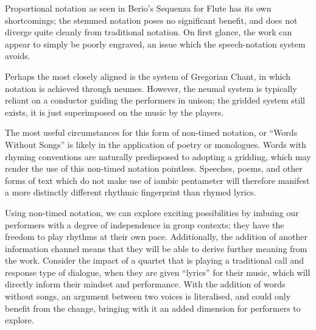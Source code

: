 Proportional notation as seen in Berio's Sequenza for Flute has its own shortcomings; the stemmed notation poses no significant benefit, and does not diverge quite cleanly from traditional notation. 
On first glance, the work can appear to simply be poorly engraved, an issue which the speech-notation system avoids.

Perhaps the most closely aligned is the system of Gregorian Chant, in which notation is achieved through neumes. 
However, the neumal system is typically reliant on a conductor guiding the performers in unison; the gridded system still exists, it is just superimposed on the music by the players.

The most useful circumstances for this form of non-timed notation, or ``Words Without Songs'' is likely in the application of poetry or monologues. 
Words with rhyming conventions are naturally predisposed to adopting a gridding, which may render the use of this non-timed notation pointless. 
Speeches, poems, and other forms of text which do not make use of iambic pentameter will therefore manifest a more distinctly different rhythmic fingerprint than rhymed lyrics. 

Using non-timed notation, we can explore exciting possibilities by imbuing our performers with a degree of independence in group contexts; 
they have the freedom to play rhythms at their own pace. 
Additionally, the addition of another information channel means that they will be able to derive further meaning from the work. 
Consider the impact of a quartet that is playing a traditional call and response type of dialogue, when they are given ``lyrics'' for their music, which will directly inform their mindset and performance. 
With the addition of words without songs, an argument between two voices is literalised, and could only benefit from the change, bringing with it an added dimension for performers to explore. 